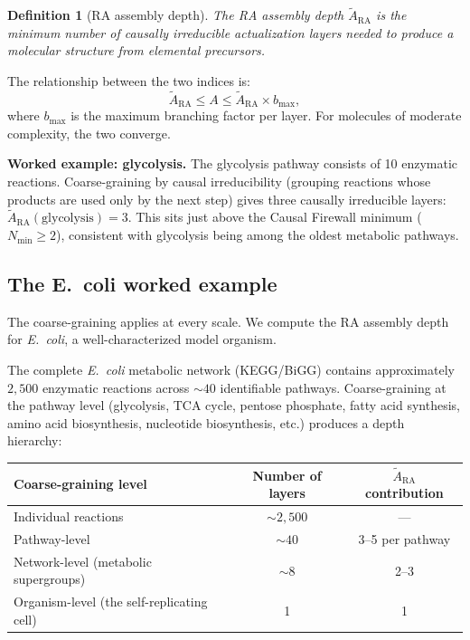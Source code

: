 \documentclass[11pt]{article}
\newtheorem{definition}{Definition}
\begin{document}
\begin{definition}[RA assembly depth]
The RA assembly depth $\tilde{A}_{\mathrm{RA}}$ is the minimum number of causally irreducible actualization layers needed to produce a molecular structure from elemental precursors.
\end{definition}

The relationship between the two indices is:
\begin{equation}
\tilde{A}_{\mathrm{RA}} \le A \le \tilde{A}_{\mathrm{RA}} \times b_{\max},
\end{equation}
where $b_{\max}$ is the maximum branching factor per layer. For molecules of moderate complexity, the two converge.

\textbf{Worked example: glycolysis.} The glycolysis pathway consists of 10 enzymatic reactions. Coarse-graining by causal irreducibility (grouping reactions whose products are used only by the next step) gives three causally irreducible layers: $\tilde{A}_{\mathrm{RA}}(\text{glycolysis})=3$. This sits just above the Causal Firewall minimum ($N_{\min}\ge 2$), consistent with glycolysis being among the oldest metabolic pathways.

\subsection{The E.~coli worked example}
\label{sec:ecoli}

The coarse-graining applies at every scale. We compute the RA assembly depth for \emph{E.~coli}, a well-characterized model organism.

The complete \emph{E.~coli} metabolic network (KEGG/BiGG) contains approximately $2{,}500$ enzymatic reactions across $\sim 40$ identifiable pathways. Coarse-graining at the pathway level (glycolysis, TCA cycle, pentose phosphate, fatty acid synthesis, amino acid biosynthesis, nucleotide biosynthesis, etc.) produces a depth hierarchy:

\begin{center}
\begin{tabular}{lcc}
\toprule
Coarse-graining level & Number of layers & $\tilde{A}_{\mathrm{RA}}$ contribution \\
\midrule
Individual reactions & $\sim 2{,}500$ & --- \\
Pathway-level & $\sim 40$ & 3--5 per pathway \\
Network-level (metabolic supergroups) & $\sim 8$ & 2--3 \\
Organism-level (the self-replicating cell) & 1 & 1 \\
\bottomrule
\end{tabular}
\end{center}
\end{document}
